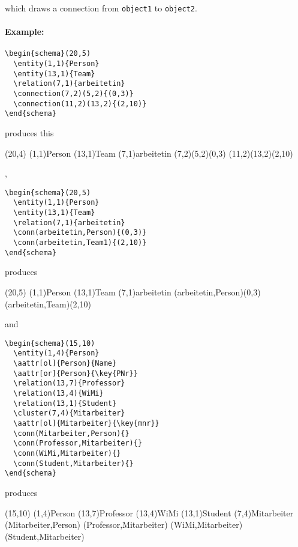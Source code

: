 \documentclass[a4paper,11pt]{article}
\begin{document}
which draws a connection from {\tt object1} to {\tt object2}.

\paragraph{Example:}

\begin{verbatim}
\begin{schema}(20,5)
  \entity(1,1){Person}
  \entity(13,1){Team}
  \relation(7,1){arbeitetin}
  \connection(7,2)(5,2){(0,3)}
  \connection(11,2)(13,2){(2,10)}
\end{schema}
\end{verbatim}

produces this

\begin{schema}(20,4)
  \entity(1,1){Person}
  \entity(13,1){Team}
  \relation(7,1){arbeitetin}
  \connection(7,2)(5,2){(0,3)}
  \connection(11,2)(13,2){(2,10)}
\end{schema}

,

\begin{verbatim}
\begin{schema}(20,5)
  \entity(1,1){Person}
  \entity(13,1){Team}
  \relation(7,1){arbeitetin}
  \conn(arbeitetin,Person){(0,3)}
  \conn(arbeitetin,Team1){(2,10)}
\end{schema}
\end{verbatim}

produces

\begin{schema}(20,5)
  \entity(1,1){Person}
  \entity(13,1){Team}
  \relation(7,1){arbeitetin}
  \conn(arbeitetin,Person){(0,3)}
  \conn(arbeitetin,Team){(2,10)}
\end{schema}

and 

\begin{verbatim}
\begin{schema}(15,10)
  \entity(1,4){Person}
  \aattr[ol]{Person}{Name}
  \aattr[or]{Person}{\key{PNr}}
  \relation(13,7){Professor}
  \relation(13,4){WiMi}
  \relation(13,1){Student}
  \cluster(7,4){Mitarbeiter}
  \aattr[ol]{Mitarbeiter}{\key{mnr}}
  \conn(Mitarbeiter,Person){}
  \conn(Professor,Mitarbeiter){}
  \conn(WiMi,Mitarbeiter){}
  \conn(Student,Mitarbeiter){}
\end{schema}
\end{verbatim}

produces

\begin{schema}(15,10)
  \entity(1,4){Person}
  \relation(13,7){Professor}
  \relation(13,4){WiMi}
  \relation(13,1){Student}
  \cluster(7,4){Mitarbeiter}
  \conn(Mitarbeiter,Person){}
  \conn(Professor,Mitarbeiter){}
  \conn(WiMi,Mitarbeiter){}
  \conn(Student,Mitarbeiter){}
\end{schema}
\end{document}
